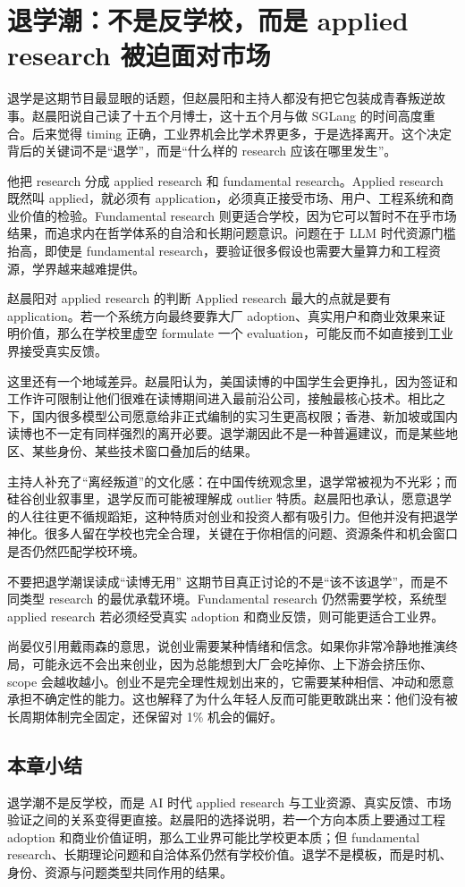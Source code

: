 \section{退学潮：不是反学校，而是 applied research 被迫面对市场}

退学是这期节目最显眼的话题，但赵晨阳和主持人都没有把它包装成青春叛逆故事。赵晨阳说自己读了十五个月博士，这十五个月与做 SGLang 的时间高度重合。后来觉得 timing 正确，工业界机会比学术界更多，于是选择离开。这个决定背后的关键词不是“退学”，而是“什么样的 research 应该在哪里发生”。

他把 research 分成 applied research 和 fundamental research。Applied research 既然叫 applied，就必须有 application，必须真正接受市场、用户、工程系统和商业价值的检验。Fundamental research 则更适合学校，因为它可以暂时不在乎市场结果，而追求内在哲学体系的自洽和长期问题意识。问题在于 LLM 时代资源门槛抬高，即使是 fundamental research，要验证很多假设也需要大量算力和工程资源，学界越来越难提供。

\begin{importantbox}{赵晨阳对 applied research 的判断}
Applied research 最大的点就是要有 application。若一个系统方向最终要靠大厂 adoption、真实用户和商业效果来证明价值，那么在学校里虚空 formulate 一个 evaluation，可能反而不如直接到工业界接受真实反馈。
\end{importantbox}

这里还有一个地域差异。赵晨阳认为，美国读博的中国学生会更挣扎，因为签证和工作许可限制让他们很难在读博期间进入最前沿公司，接触最核心技术。相比之下，国内很多模型公司愿意给非正式编制的实习生更高权限；香港、新加坡或国内读博也不一定有同样强烈的离开必要。退学潮因此不是一种普遍建议，而是某些地区、某些身份、某些技术窗口叠加后的结果。

主持人补充了“离经叛道”的文化感：在中国传统观念里，退学常被视为不光彩；而硅谷创业叙事里，退学反而可能被理解成 outlier 特质。赵晨阳也承认，愿意退学的人往往更不循规蹈矩，这种特质对创业和投资人都有吸引力。但他并没有把退学神化。很多人留在学校也完全合理，关键在于你相信的问题、资源条件和机会窗口是否仍然匹配学校环境。

\begin{warningbox}{不要把退学潮误读成“读博无用”}
这期节目真正讨论的不是“该不该退学”，而是不同类型 research 的最优承载环境。Fundamental research 仍然需要学校，系统型 applied research 若必须经受真实 adoption 和商业反馈，则可能更适合工业界。
\end{warningbox}

尚晏仪引用戴雨森的意思，说创业需要某种情绪和信念。如果你非常冷静地推演终局，可能永远不会出来创业，因为总能想到大厂会吃掉你、上下游会挤压你、scope 会越收越小。创业不是完全理性规划出来的，它需要某种相信、冲动和愿意承担不确定性的能力。这也解释了为什么年轻人反而可能更敢跳出来：他们没有被长周期体制完全固定，还保留对 1\% 机会的偏好。

\subsection{本章小结}

退学潮不是反学校，而是 AI 时代 applied research 与工业资源、真实反馈、市场验证之间的关系变得更直接。赵晨阳的选择说明，若一个方向本质上要通过工程 adoption 和商业价值证明，那么工业界可能比学校更本质；但 fundamental research、长期理论问题和自洽体系仍然有学校价值。退学不是模板，而是时机、身份、资源与问题类型共同作用的结果。

